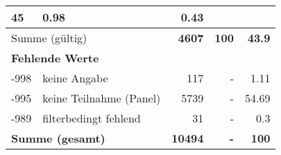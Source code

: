 \begin{longtable}{lXrrr}
       \num{45} &
       \num[round-mode=places,round-precision=2]{0.98} &
         \num[round-mode=places,round-precision=2]{0.43} \\
     \midrule
     \multicolumn{2}{l}{Summe (gültig)} &
       \textbf{\num{4607}} &
     \textbf{\num{100}} &
       \textbf{\num[round-mode=places,round-precision=2]{43.9}} \\
     \multicolumn{5}{l}{\textbf{Fehlende Werte}}\\
       -998 &
       keine Angabe &
         \num{117} &
        - &
         \num[round-mode=places,round-precision=2]{1.11} \\
       -995 &
       keine Teilnahme (Panel) &
         \num{5739} &
        - &
         \num[round-mode=places,round-precision=2]{54.69} \\
       -989 &
       filterbedingt fehlend &
         \num{31} &
        - &
         \num[round-mode=places,round-precision=2]{0.3} \\
     \midrule
     \multicolumn{2}{l}{\textbf{Summe (gesamt)}} &
          \textbf{\num{10494}} &
        \textbf{-} &
        \textbf{\num{100}} \\
     \bottomrule
     \end{longtable}
     
